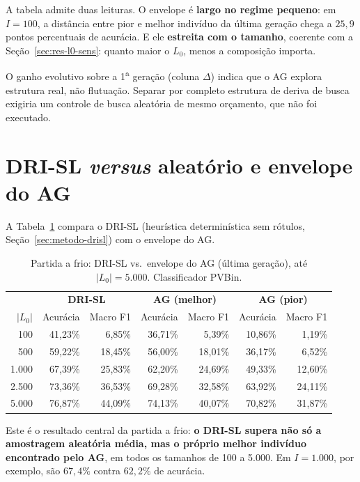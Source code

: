 A tabela admite duas leituras. O envelope é \textbf{largo no regime pequeno}:
em $I=100$, a distância entre pior e melhor indivíduo da última geração chega
a $25{,}9$ pontos percentuais de acurácia. E ele \textbf{estreita com o
tamanho}, coerente com a Seção~\ref{sec:res-l0-sens}: quanto maior o $L_0$,
menos a composição importa.

O ganho evolutivo sobre a 1\textsuperscript{a} geração (coluna $\Delta$)
indica que o AG explora estrutura real, não flutuação. Separar por completo
estrutura de deriva de busca exigiria um controle de busca aleatória de mesmo
orçamento, que não foi executado.

\section{DRI-SL \textit{versus} aleatório e envelope do AG}
\label{sec:res-l0-drisl}

A Tabela~\ref{tab:drisl-vs-ag} compara o DRI-SL (heurística
determinística sem rótulos, Seção~\ref{sec:metodo-drisl}) com o envelope do
AG.

\begin{table}[htb]
\centering
\caption{Partida a frio: DRI-SL vs.\ envelope do AG (última geração),
até $|L_0|=5.000$. Classificador PVBin.}
\label{tab:drisl-vs-ag}
\small
\begin{tabular}{r rr rr rr}
\toprule
 & \multicolumn{2}{c}{\textbf{DRI-SL}} & \multicolumn{2}{c}{\textbf{AG (melhor)}} & \multicolumn{2}{c}{\textbf{AG (pior)}} \\
\textbf{$|L_0|$} & Acurácia & Macro F1 & Acurácia & Macro F1 & Acurácia & Macro F1 \\
\midrule
100   & 41,23\% & 6,85\%  & 36,71\% & 5,39\%  & 10,86\% & 1,19\% \\
500   & 59,22\% & 18,45\% & 56,00\% & 18,01\% & 36,17\% & 6,52\% \\
1.000 & 67,39\% & 25,83\% & 62,20\% & 24,69\% & 49,33\% & 12,60\% \\
2.500 & 73,36\% & 36,53\% & 69,28\% & 32,58\% & 63,92\% & 24,11\% \\
5.000 & 76,87\% & 44,09\% & 74,13\% & 40,07\% & 70,82\% & 31,87\% \\
\bottomrule
\end{tabular}
\end{table}

Este é o resultado central da partida a frio: \textbf{o DRI-SL supera não só a
amostragem aleatória média, mas o próprio melhor indivíduo encontrado pelo
AG}, em todos os tamanhos de 100 a 5.000. Em $I=1.000$, por exemplo, são
$67{,}4\%$ contra $62{,}2\%$ de acurácia.

